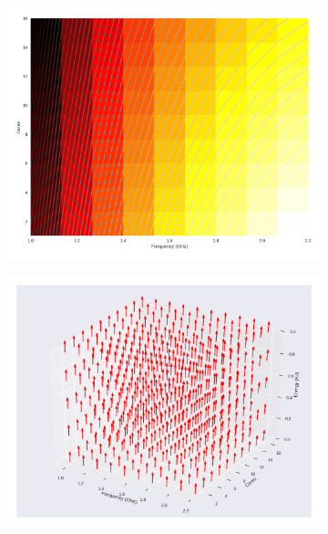 \begin{figure}[H]
	\centering
	\begin{subfigure}[b]{0.45\textwidth}
		\includegraphics[width=\textwidth]{models/figures/analisys/w0.png}
	\end{subfigure}
	\begin{subfigure}[b]{0.45\textwidth}
		\includegraphics[width=\textwidth]{models/figures/analisys/w0_3d.png}
	\end{subfigure}
\end{figure}

